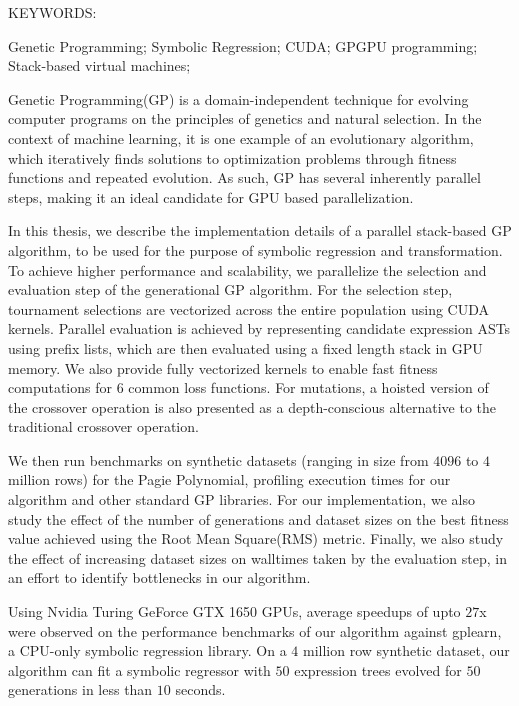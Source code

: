 \abstract

\noindent KEYWORDS: \hspace*{0.5em} 
\parbox[t]{4.4in}{  
  Genetic Programming;
	Symbolic Regression; 
  CUDA;
  GPGPU programming; 
  Stack-based virtual machines; 
}

\vspace*{24pt}

\noindent Genetic Programming(GP) is a domain-independent technique for evolving computer programs on the principles of genetics and natural selection. In the context of machine learning, it is one example of an evolutionary algorithm, which iteratively finds solutions to optimization problems through fitness functions and repeated evolution. As such, GP has several inherently parallel steps, making it an ideal candidate for GPU based parallelization. 

In this thesis, we describe the implementation details of a parallel stack-based GP algorithm, to be used for the purpose of symbolic regression and transformation. To achieve higher performance and scalability, we parallelize the selection and evaluation step of the generational GP algorithm. 
For the selection step, tournament selections are vectorized across the entire population using CUDA kernels. 
Parallel evaluation is achieved by representing candidate expression ASTs using prefix lists, which are then evaluated using a fixed length stack in GPU memory.
We also provide fully vectorized kernels to enable fast fitness computations for $6$ common loss functions. For mutations, a hoisted version of the crossover operation is also presented as a depth-conscious alternative to the traditional crossover operation.

We then run benchmarks on synthetic datasets (ranging in size from $4096$ to $4$ million rows) for the Pagie Polynomial, profiling execution times for our algorithm and other standard GP libraries. For our implementation, we also study the effect of the number of generations and dataset sizes on the best fitness value achieved using the Root Mean Square(RMS) metric. Finally, we also study the effect of increasing dataset sizes on walltimes taken by the evaluation step, in an effort to identify bottlenecks in our algorithm.

Using Nvidia Turing GeForce GTX 1650 GPUs, average speedups of upto $27$x were observed on the performance benchmarks of our algorithm against gplearn, a CPU-only symbolic regression library. On a $4$ million row synthetic dataset, our algorithm can fit a symbolic regressor with $50$ expression trees evolved for $50$ generations in less than $10$ seconds. 

